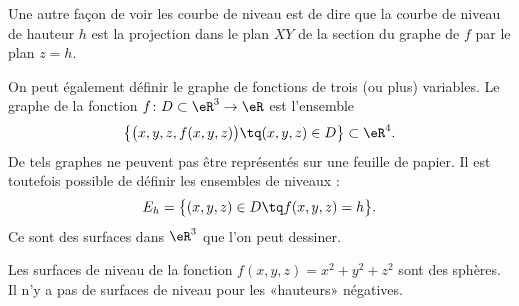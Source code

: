 Une autre façon de voir les courbe de niveau est de dire que la courbe de niveau de hauteur $h$ est la projection dans le plan $XY$ de la section du graphe de $f$ par le plan $z=h$.

On peut également définir le graphe de fonctions de trois (ou plus) variables. Le graphe de la fonction $f\colon D\subset\eR^3\to \eR$ est l'ensemble
\begin{equation}
    \big\{ \big( x,y,z,f(x,y,z) \big)\tq (x,y,z)\in D \big\}\subset \eR^4.
\end{equation}
De tels graphes ne peuvent pas être représentés sur une feuille de papier. Il est toutefois possible de définir les ensembles de niveaux :
\begin{equation}
    E_h=\big\{ (x,y,z)\in D\tq  f(x,y,z)=h\big\}.
\end{equation}
Ce sont des surfaces dans $\eR^3$ que l'on peut dessiner.

\begin{example}
    Les surfaces de niveau de la fonction $f(x,y,z)=x^2+y^2+z^2$ sont des sphères. Il n'y a pas de surfaces de niveau pour les «hauteurs» négatives.
\end{example}

